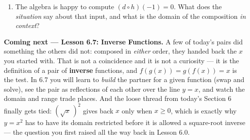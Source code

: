 \documentclass[10pt]{article}
\begin{document}
\begin{extensionbox}
\begin{enumerate}[label=(\alph*), leftmargin=1.8em, itemsep=5pt]
  \item The algebra is happy to compute $(d\circ h)(-1)=0$. What does the \emph{situation} say about
        that input, and what is the domain of the composition \emph{in context}?
\end{enumerate}
\end{extensionbox}

\begin{spiralbox}
\textbf{Coming next --- Lesson 6.7: Inverse Functions.} A few of today's pairs did something the
others did not: composed in \emph{either} order, they handed back the $x$ you started with. That is
not a coincidence and it is not a curiosity --- it is the definition of a pair of \textbf{inverse}
functions, and $f(g(x))=g(f(x))=x$ is the test. In 6.7 you will learn to \emph{build} the partner
for a given function (swap and solve), see the pair as reflections of each other over the line
$y=x$, and watch the domain and range trade places. And the loose thread from today's Section 6
finally gets tied: $\left(\sqrt{x}\,\right)^{2}$ gives back $x$ only when $x\ge0$, which is exactly
why $y=x^{2}$ has to have its domain restricted before it is allowed a square-root inverse --- the
question you first raised all the way back in Lesson 6.0.
\end{spiralbox}
\end{document}
